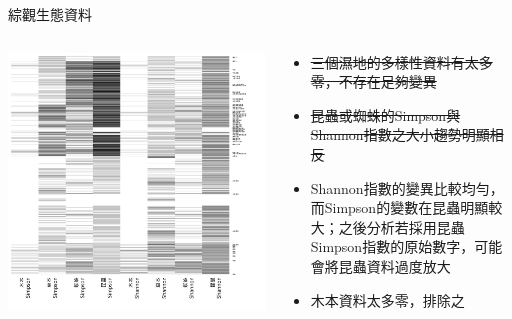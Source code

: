 \documentclass[10pt, aspectratio=1610, xcolor=table]{beamer}
\begin{document}
\begin{frame}{綜觀生態資料}
\begin{columns}[onlytextwidth, c]
	\begin{column}{0.55\textwidth}
	\includegraphics[trim=25 25 25 25, width=1\textwidth]{invalid-bio.png}
	\end{column}
	\begin{column}{0.45\textwidth}
		\begin{itemize}
			\item \sout{三個濕地的多樣性資料有太多零，不存在足夠變異}
			\item \sout{昆蟲或蜘蛛的Simpson與Shannon指數之大小趨勢明顯相反}
			\item Shannon指數的變異比較均勻，而Simpson的變數在昆蟲明顯較大；之後分析若採用昆蟲Simpson指數的原始數字，可能會將昆蟲資料過度放大
			\item 木本資料太多零，排除之
		\end{itemize}
	\end{column}
\end{columns}
\end{frame}
\end{document}
